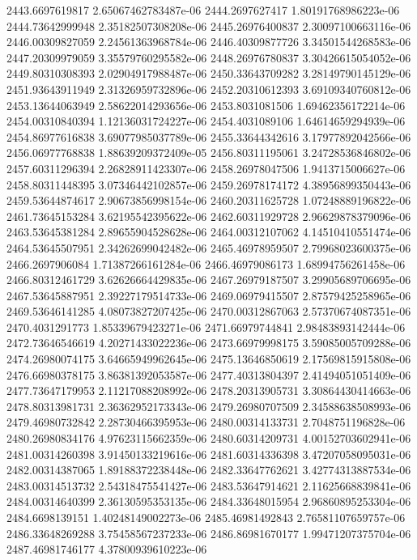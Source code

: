 {2443.6697619817 2.65067462783487e-06
2444.2697627417 1.80191768986223e-06
2444.73642999948 2.35182507308208e-06
2445.26976400837 2.30097100663116e-06
2446.00309827059 2.24561363968784e-06
2446.40309877726 3.34501544268583e-06
2447.20309979059 3.35579760295582e-06
2448.26976780837 3.30426615054052e-06
2449.80310308393 2.02904917988487e-06
2450.33643709282 3.28149790145129e-06
2451.93643911949 2.31326959732896e-06
2452.20310612393 3.69109340760812e-06
2453.13644063949 2.58622014293656e-06
2453.8031081506 1.69462356172214e-06
2454.00310840394 1.12136031724227e-06
2454.4031089106 1.64614659294939e-06
2454.86977616838 3.69077985037789e-06
2455.33644342616 3.17977892042566e-06
2456.06977768838 1.88639209372409e-05
2456.80311195061 3.24728536846802e-06
2457.60311296394 2.26828911423307e-06
2458.26978047506 1.9413715006627e-06
2458.80311448395 3.07346442102857e-06
2459.26978174172 4.38956899350443e-06
2459.53644874617 2.90673856998154e-06
2460.20311625728 1.07248889196822e-06
2461.73645153284 3.62195542395622e-06
2462.60311929728 2.96629878379096e-06
2463.53645381284 2.89655904528628e-06
2464.00312107062 4.14510410551474e-06
2464.53645507951 2.34262699042482e-06
2465.46978959507 2.79968023600375e-06
2466.2697906084 1.71387266161284e-06
2466.46979086173 1.68994756261458e-06
2466.80312461729 3.62626664429835e-06
2467.26979187507 3.29905689706695e-06
2467.53645887951 2.39227179514733e-06
2469.06979415507 2.87579425258965e-06
2469.53646141285 4.08073827207425e-06
2470.00312867063 2.57370674087351e-06
2470.4031291773 1.85339679423271e-06
2471.66979744841 2.98483893142444e-06
2472.73646546619 4.20271433022236e-06
2473.66979998175 3.59085005709288e-06
2474.26980074175 3.64665949962645e-06
2475.13646850619 2.17569815915808e-06
2476.66980378175 3.86381392053587e-06
2477.40313804397 2.41494051051409e-06
2477.73647179953 2.11217088208992e-06
2478.20313905731 3.30864430414663e-06
2478.80313981731 2.36362952173343e-06
2479.26980707509 2.34588638508993e-06
2479.46980732842 2.28730466395953e-06
2480.00314133731 2.7048751196828e-06
2480.26980834176 4.97623115662359e-06
2480.60314209731 4.00152703602941e-06
2481.00314260398 3.91450133219616e-06
2481.60314336398 3.47207058095031e-06
2482.00314387065 1.89188372238448e-06
2482.33647762621 3.42774313887534e-06
2483.00314513732 2.54318475541427e-06
2483.53647914621 2.11625668839841e-06
2484.00314640399 2.36130595353135e-06
2484.33648015954 2.96860895253304e-06
2484.6698139151 1.40248149002273e-06
2485.46981492843 2.76581107659757e-06
2486.33648269288 3.75458567237233e-06
2486.86981670177 1.99471207375704e-06
2487.46981746177 4.37800939610223e-06
}
